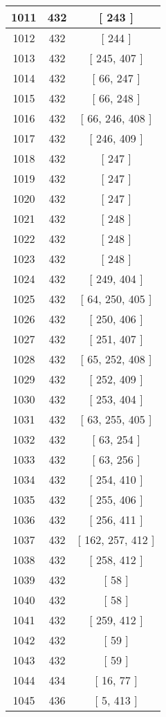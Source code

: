 \begin{center}
\begin{longtable}[H]{|| c c c ||}
\hline
1011 & 432 & [ 243 ] \\ 
\hline
1012 & 432 & [ 244 ] \\ 
\hline
1013 & 432 & [ 245, 407 ] \\ 
\hline
1014 & 432 & [ 66, 247 ] \\ 
\hline
1015 & 432 & [ 66, 248 ] \\ 
\hline
1016 & 432 & [ 66, 246, 408 ] \\ 
\hline
1017 & 432 & [ 246, 409 ] \\ 
\hline
1018 & 432 & [ 247 ] \\ 
\hline
1019 & 432 & [ 247 ] \\ 
\hline
1020 & 432 & [ 247 ] \\ 
\hline
1021 & 432 & [ 248 ] \\ 
\hline
1022 & 432 & [ 248 ] \\ 
\hline
1023 & 432 & [ 248 ] \\ 
\hline
1024 & 432 & [ 249, 404 ] \\ 
\hline
1025 & 432 & [ 64, 250, 405 ] \\ 
\hline
1026 & 432 & [ 250, 406 ] \\ 
\hline
1027 & 432 & [ 251, 407 ] \\ 
\hline
1028 & 432 & [ 65, 252, 408 ] \\ 
\hline
1029 & 432 & [ 252, 409 ] \\ 
\hline
1030 & 432 & [ 253, 404 ] \\ 
\hline
1031 & 432 & [ 63, 255, 405 ] \\ 
\hline
1032 & 432 & [ 63, 254 ] \\ 
\hline
1033 & 432 & [ 63, 256 ] \\ 
\hline
1034 & 432 & [ 254, 410 ] \\ 
\hline
1035 & 432 & [ 255, 406 ] \\ 
\hline
1036 & 432 & [ 256, 411 ] \\ 
\hline
1037 & 432 & [ 162, 257, 412 ] \\ 
\hline
1038 & 432 & [ 258, 412 ] \\ 
\hline
1039 & 432 & [ 58 ] \\ 
\hline
1040 & 432 & [ 58 ] \\ 
\hline
1041 & 432 & [ 259, 412 ] \\ 
\hline
1042 & 432 & [ 59 ] \\ 
\hline
1043 & 432 & [ 59 ] \\ 
\hline
1044 & 434 & [ 16, 77 ] \\ 
\hline
1045 & 436 & [ 5, 413 ] \\ 

\end{longtable}
\end{center}
